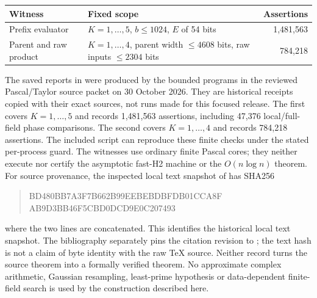 \begin{center}
\begin{tabular}{@{}p{}p{}r@{}}
\toprule
Witness & Fixed scope & Assertions\\
\midrule
Prefix evaluator & $K=1,\ldots,5$, $b\leq1024$, $E$ of 54 bits
 & 1,481,563\\
Parent and raw product & $K=1,\ldots,4$, parent width $\leq4608$ bits,
 raw inputs $\leq2304$ bits & 784,218\\
\bottomrule
\end{tabular}
\end{center}
The saved reports in  were produced by the bounded
programs in the reviewed Pascal/Taylor source packet on 30 October 2026.
They are historical receipts copied with their exact sources, not runs
made for this focused release. The first covers $K=1,\ldots,5$ and records
1,481,563 assertions, including 47,376 local/full-field phase comparisons.
The second covers $K=1,\ldots,4$ and records 784,218 assertions. The
included  script can reproduce these
finite checks under the stated per-process guard. The witnesses use
ordinary finite Pascal cores; they neither execute nor certify the
asymptotic fast-H2 machine or the $O(n\log n)$ theorem.
For source provenance, the inspected local text snapshot of
\cite{OpenAI26} has SHA256
\begin{quote}\footnotesize\ttfamily
BD480BB7A3F7B662B99EEBEBDBFDB01CCA8F\\
AB9D3BB46F5CBD0DCD9E0C207493
\end{quote}
where the two lines are concatenated. This identifies the historical
local text snapshot. The bibliography separately pins the citation
revision to ; the text hash
is not a claim of byte identity with the raw TeX source. Neither record
turns the source theorem into a formally verified theorem.
No approximate complex arithmetic, Gaussian resampling, least-prime
hypothesis or data-dependent finite-field search is used by the
construction described here.


